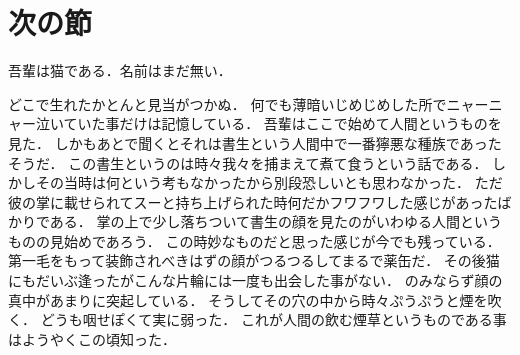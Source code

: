 \documentclass[./main]{subfiles}
\begin{document}
\section{次の節}

吾輩は猫である．名前はまだ無い\cite{猫}．

どこで生れたかとんと見当がつかぬ．
何でも薄暗いじめじめした所でニャーニャー泣いていた事だけは記憶している．
吾輩はここで始めて人間というものを見た．
しかもあとで聞くとそれは書生という人間中で一番獰悪な種族であったそうだ．
この書生というのは時々我々を捕まえて煮て食うという話である．
しかしその当時は何という考もなかったから別段恐しいとも思わなかった．
ただ彼の掌に載せられてスーと持ち上げられた時何だかフワフワした感じがあったばかりである．
掌の上で少し落ちついて書生の顔を見たのがいわゆる人間というものの見始めであろう．
この時妙なものだと思った感じが今でも残っている．
第一毛をもって装飾されべきはずの顔がつるつるしてまるで薬缶だ．
その後猫にもだいぶ逢ったがこんな片輪には一度も出会した事がない．
のみならず顔の真中があまりに突起している．
そうしてその穴の中から時々ぷうぷうと煙を吹く．
どうも咽せぽくて実に弱った．
これが人間の飲む煙草というものである事はようやくこの頃知った．
\end{document}
